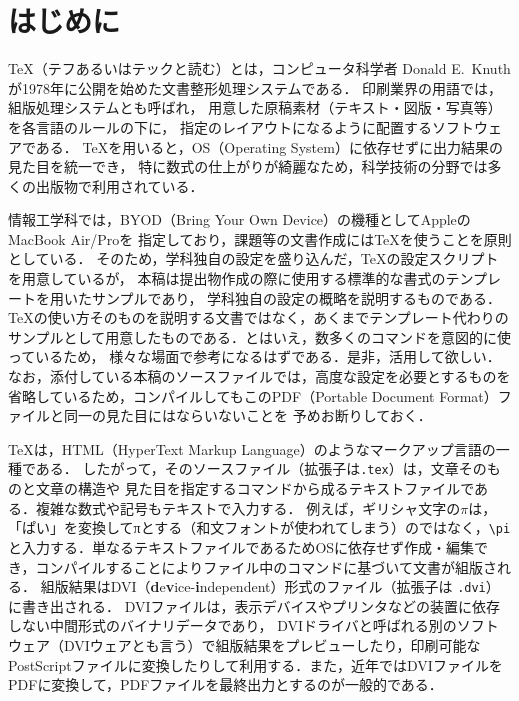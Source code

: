 \section{はじめに}

{\TeX}（テフあるいはテックと読む）とは，コンピュータ科学者
Donald E.\ Knuth \cite{Knuth}が1978年に公開を始めた文書整形処理システムである．
印刷業界の用語では，組版処理システムとも呼ばれ，
用意した原稿素材（テキスト・図版・写真等）を各言語のルール\cite{JIS}\cite{typst}の下に，
指定のレイアウトになるように配置するソフトウェアである．
{\TeX}を用いると，OS（Operating System）に依存せずに出力結果の見た目を統一でき，
特に数式の仕上がりが綺麗なため，科学技術の分野では多くの出版物で利用されている．

情報工学科では，BYOD（Bring Your Own Device）の機種としてAppleのMacBook Air/Proを
指定しており，課題等の文書作成には{\TeX}を使うことを原則としている．
そのため，学科独自の設定を盛り込んだ，{\TeX}の設定スクリプトを用意しているが，
本稿は提出物作成の際に使用する標準的な書式のテンプレートを用いたサンプルであり，
学科独自の設定の概略を説明するものである．
{\TeX}の使い方そのものを説明する文書ではなく，あくまでテンプレート代わりの
サンプルとして用意したものである．とはいえ，数多くのコマンドを意図的に使っているため，
様々な場面で参考になるはずである．是非，活用して欲しい．
なお，添付している本稿のソースファイルでは，高度な設定を必要とするものを
省略しているため，コンパイルしてもこのPDF（Portable Document Format）ファイルと同一の見た目にはならいないことを
予めお断りしておく．

{\TeX}は，HTML（HyperText Markup Language）のようなマークアップ言語の一種である．
したがって，そのソースファイル（拡張子は\texttt{.tex}）は，文章そのものと文章の構造や
見た目を指定するコマンドから成るテキストファイルである．複雑な数式や記号もテキストで入力する．
例えば，ギリシャ文字の$\pi$は，「ぱい」を変換してπとする（和文フォントが使われてしまう）のではなく，\verb|\pi|と入力する．単なるテキストファイルであるためOSに依存せず作成・編集でき，コンパイルすることによりファイル中のコマンドに基づいて文書が組版される．
組版結果はDVI（\textbf{\textsf{d}}e\textbf{\textsf{v}}ice-\textbf{\textsf{i}}ndependent）形式のファイル（拡張子は \texttt{.dvi}）に書き出される．
DVIファイルは，表示デバイスやプリンタなどの装置に依存しない中間形式のバイナリデータであり，
DVIドライバと呼ばれる別のソフトウェア（DVIウェアとも言う）で組版結果をプレビューしたり，印刷可能なPostScript\cite{PS}ファイルに変換したりして利用する．また，近年ではDVIファイルをPDF\cite{PDF}に変換して，PDFファイルを最終出力とするのが一般的である．

